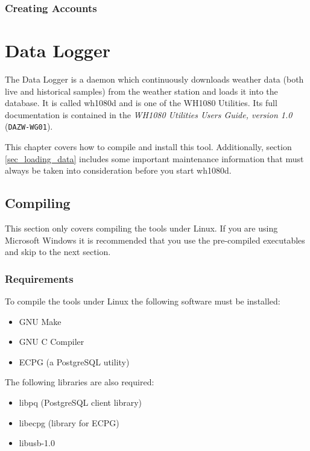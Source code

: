 \documentclass[a4paper,10pt,draft]{book}
\begin{document}
\subsection{Creating Accounts}

\chapter{Data Logger}

The Data Logger is a daemon which continuously downloads weather data (both live and historical samples) from the weather station and loads it into the database. It is called wh1080d and is one of the WH1080 Utilities. Its full documentation is contained in the \emph{WH1080 Utilities Users Guide, version 1.0} (\verb|DAZW-WG01|).

This chapter covers how to compile and install this tool. Additionally, section \ref{sec_loading_data} includes some important maintenance information that must always be taken into consideration before you start wh1080d.

\section{Compiling}
This section only covers compiling the tools under Linux. If you are using Microsoft Windows it is recommended that you use the pre-compiled executables and skip to the next section.

\subsection{Requirements}
To compile the tools under Linux the following software must be installed:
\begin{itemize}
\item GNU Make
\item GNU C Compiler
\item ECPG (a PostgreSQL utility)
\end{itemize}

The following libraries are also required:
\begin{itemize}
\item libpq (PostgreSQL client library)
\item libecpg (library for ECPG)
\item libusb-1.0
\end{itemize}
\end{document}
